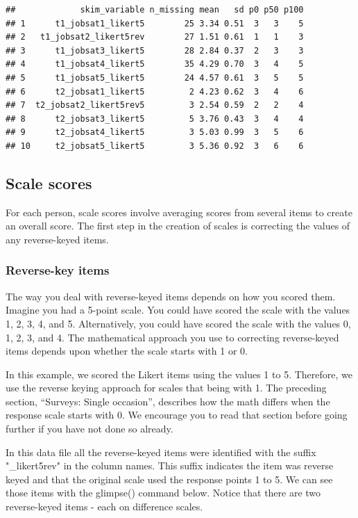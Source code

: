 \documentclass[
]{krantz}
\begin{document}
\begin{verbatim}
##             skim_variable n_missing mean   sd p0 p50 p100
## 1      t1_jobsat1_likert5        25 3.34 0.51  3   3    5
## 2   t1_jobsat2_likert5rev        27 1.51 0.61  1   1    3
## 3      t1_jobsat3_likert5        28 2.84 0.37  2   3    3
## 4      t1_jobsat4_likert5        35 4.29 0.70  3   4    5
## 5      t1_jobsat5_likert5        24 4.57 0.61  3   5    5
## 6      t2_jobsat1_likert5         2 4.23 0.62  3   4    6
## 7  t2_jobsat2_likert5rev5         3 2.54 0.59  2   2    4
## 8      t2_jobsat3_likert5         5 3.76 0.43  3   4    4
## 9      t2_jobsat4_likert5         3 5.03 0.99  3   5    6
## 10     t2_jobsat5_likert5         3 5.36 0.92  3   6    6
\end{verbatim}

\hypertarget{scale-scores-3}{%
\subsection{Scale scores}\label{scale-scores-3}}

For each person, scale scores involve averaging scores from several items to create an overall score. The first step in the creation of scales is correcting the values of any reverse-keyed items.

\hypertarget{reverse-key-items-3}{%
\subsubsection{Reverse-key items}\label{reverse-key-items-3}}

The way you deal with reverse-keyed items depends on how you scored them. Imagine you had a 5-point scale. You could have scored the scale with the values 1, 2, 3, 4, and 5. Alternatively, you could have scored the scale with the values 0, 1, 2, 3, and 4. The mathematical approach you use to correcting reverse-keyed items depends upon whether the scale starts with 1 or 0.

In this example, we scored the Likert items using the values 1 to 5. Therefore, we use the reverse keying approach for scales that being with 1. The preceding section, ``Surveys: Single occasion'', describes how the math differs when the response scale starts with 0. We encourage you to read that section before going further if you have not done so already.

In this data file all the reverse-keyed items were identified with the suffix "\_likert5rev" in the column names. This suffix indicates the item was reverse keyed and that the original scale used the response points 1 to 5. We can see those items with the glimpse() command below. Notice that there are two reverse-keyed items - each on difference scales.
\end{document}
